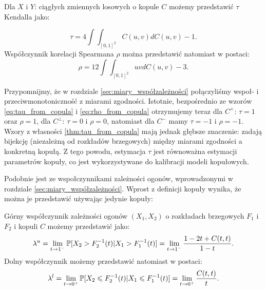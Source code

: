 \begin{prop}
	Dla $X$ i $Y$: ciągłych zmiennych losowych o kopule $C$ możemy przedstawić $\tau$ Kendalla jako:
	
	\begin{equation}
		\tau = 4\int\int_{[0, 1]^2}C(u,v)dC(u,v) -1.
		\label{eq:tau_from_copula}
	\end{equation}
	Współczynnik korelacji Spearmana $\rho$ można przedstawić natomiast w postaci:
	\begin{equation}	
		\rho = 12\int\int_{[0, 1]^2}uvdC(u,v) -3.
		\label{eq:rho_from_copula}
	\end{equation}
	\label{thm:tau_from_copula}
\end{prop}

Przypomnijmy, że w rozdziale \ref{sec:miary_współzależności} połączyliśmy wspoł- i przeciwmonotoniczność z miarami zgodności. Istotnie, bezpośrednio ze wzorów \ref{eq:tau_from_copula} i \ref{eq:rho_from_copula} otrzymujemy teraz dla $C^{+}$: $\tau=1$ oraz $\rho=1$, dla $C^{\perp}$: $\tau=0$ i $\rho=0$, natomiast dla $C^{-}$ mamy $\tau=-1$ i $\rho=-1$. Wzory z własności \ref{thm:tau_from_copula} mają jednak głębsze znaczenie: zadają bijekcję (niezależną od rozkładów brzegowych) między miarami zgodności a konkretną kopułą. Z tego powodu, estymacja $\tau$ jest równoważna estymacji parametrów kopuły, co jest wykorzystywane do kalibracji modeli kopułowych.

Podobnie jest ze wspołczynnikami zależności ogonów, wprowadzonymi w rozdziale \ref{sec:miary_współzależności}. Wprost z definicji kopuły wynika, że można je przedstawić używając jedynie kopuły:
\begin{prop}
		Górny współczynnik zależności ogonów $(X_1, X_2)$ o rozkładach brzegowych $F_1$ i $F_2$ i kopuli $C$ możemy przedstawić jako:
		$$ \lambda^{u} = \lim\limits_{t\to1^{-}}\mathbb{P}[X_2 > F_2^{-1}(t) \vert X_1 > F_1^{-1}(t) ] = \lim\limits_{t\to1^{-}}\frac{1-2t+C(t, t)}{1-t}.$$
		Dolny współczynnik możemy przedstawić natomiast w postaci:
		$$ \lambda^{l} = \lim\limits_{t\to0^{+}}\mathbb{P}[X_2 \leqslant F_2^{-1}(t) \vert X_1 \leqslant F_1^{-1}(t) ] = \lim\limits_{t\to0^{+}}\frac{C(t, t)}{t}.$$
\end{prop}
